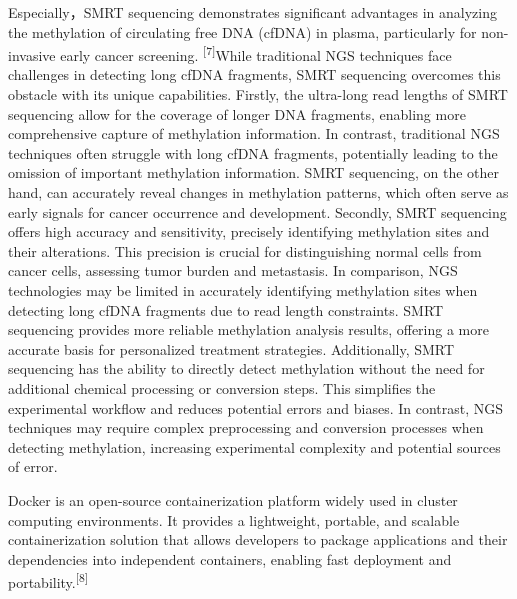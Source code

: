 \documentclass[
]{article}
\begin{document}
Especially，SMRT sequencing demonstrates significant advantages in
analyzing the methylation of circulating free DNA (cfDNA) in plasma,
particularly for non-invasive early cancer screening.
\textsuperscript{{[}7{]}}While traditional NGS techniques face
challenges in detecting long cfDNA fragments, SMRT sequencing overcomes
this obstacle with its unique capabilities. Firstly, the ultra-long read
lengths of SMRT sequencing allow for the coverage of longer DNA
fragments, enabling more comprehensive capture of methylation
information. In contrast, traditional NGS techniques often struggle with
long cfDNA fragments, potentially leading to the omission of important
methylation information. SMRT sequencing, on the other hand, can
accurately reveal changes in methylation patterns, which often serve as
early signals for cancer occurrence and development. Secondly, SMRT
sequencing offers high accuracy and sensitivity, precisely identifying
methylation sites and their alterations. This precision is crucial for
distinguishing normal cells from cancer cells, assessing tumor burden
and metastasis. In comparison, NGS technologies may be limited in
accurately identifying methylation sites when detecting long cfDNA
fragments due to read length constraints. SMRT sequencing provides more
reliable methylation analysis results, offering a more accurate basis
for personalized treatment strategies. Additionally, SMRT sequencing has
the ability to directly detect methylation without the need for
additional chemical processing or conversion steps. This simplifies the
experimental workflow and reduces potential errors and biases. In
contrast, NGS techniques may require complex preprocessing and
conversion processes when detecting methylation, increasing experimental
complexity and potential sources of error.

Docker is an open-source containerization platform widely used in
cluster computing environments. It provides a lightweight, portable, and
scalable containerization solution that allows developers to package
applications and their dependencies into independent containers,
enabling fast deployment and portability.\textsuperscript{{[}8{]}}
\end{document}
